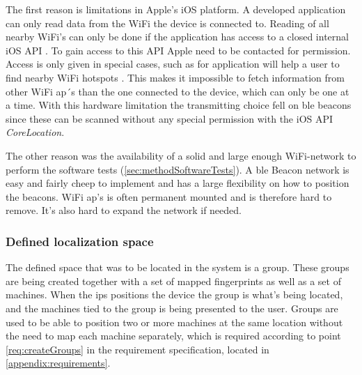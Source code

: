 \bigskip

The first reason is limitations in Apple's iOS platform.
A developed application can only read data from the WiFi the device is connected to.
Reading of all nearby WiFi's can only be done if the application has access to a closed internal iOS API \cite{NEHotspotHelperAppleDeveloper}.
To gain access to this API Apple need to be contacted for permission.
Access is only given in special cases, such as for application will help a user to find nearby WiFi hotspots \cite{TechnicalQA1942IOS}.
This makes it impossible to fetch information from other WiFi \acrshort{ap}´s than the one connected to the device, which can only be one at a time.
With this hardware limitation the transmitting choice fell on \acrshort{ble} beacons since these can be scanned without any special permission with the iOS API \textit{CoreLocation}.

\bigskip

The other reason was the availability of a solid and large enough WiFi-network to perform the software tests (\cref{sec:methodSoftwareTests}).
A \acrshort{ble} Beacon network is easy and fairly cheep to implement and has a large flexibility on how to position the beacons.
WiFi \acrshort{ap}'s is often permanent mounted and is therefore hard to remove.
It's also hard to expand the network if needed.


\subsubsection{Defined localization space}\label{sec:methodSoftwareDesignDefinedSpace} The defined space that was to be located in the system is a group.
These groups are being created together with a set of mapped fingerprints as well as a set of machines.
When the \acrshort{ips} positions the device the group is what's being located, and the machines tied to the group is being presented to the user.
Groups are used to be able to position two or more machines at the same location without the need to map each machine separately, which is required according to point \ref{req:createGroups} in the requirement specification, located in \cref{appendix:requirements}.
